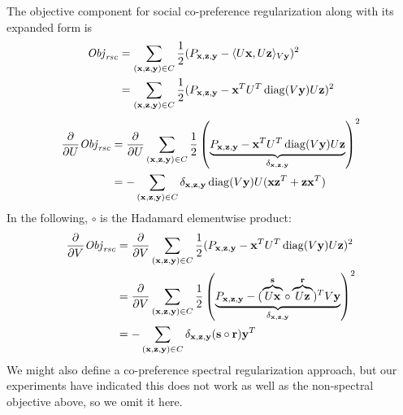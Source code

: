 The objective component for social co-preference regularization along
with its expanded form is
\begin{align}
\Obj_\rsc & = \sum_{(\x,\z,\y) \in C} \frac{1}{2} (P_{\x,\z,\y} - \la U\x, U\z \ra_{V\y})^2 \\
& = \sum_{(\x,\z,\y) \in C} \frac{1}{2} (P_{\x,\z,\y} - \x^T U^T \diag(V\y) U \z)^2 \nonumber
\end{align}
\begin{align*}
\frac{\partial}{\partial U} \Obj_\rsc & = \frac{\partial}{\partial U} \sum_{(\x,\z,\y) \in C} \frac{1}{2} \left( \underbrace{P_{\x,\z,\y} - \x^T U^T \diag(V\y) U \z}_{\delta_{\x,\z,\y}} \right)^2\\
& = - \sum_{(\x,\z,\y) \in C} \delta_{\x,\z,\y} \diag(V\y) U (\x \z^T + \z \x^T)
\end{align*}
In the following, $\circ$ is the Hadamard elementwise product:
\begin{align*}
\frac{\partial}{\partial V} \Obj_\rsc & = \frac{\partial}{\partial V} \sum_{(\x,\z,\y) \in C} \frac{1}{2} (P_{\x,\z,\y} - \x^T U^T \diag(V\y) U \z)^2\\
 & = \frac{\partial}{\partial V} \sum_{(\x,\z,\y) \in C} \frac{1}{2} \left( \underbrace{P_{\x,\z,\y} -  (\overbrace{U\x}^\s \circ \overbrace{U\z}^\r)^T V\y}_{\delta_{\x,\z,\y}} \right)^2\\
 & = - \sum_{(\x,\z,\y) \in C} \delta_{\x,\z,\y} (\s \circ \r) \y^T
\end{align*}
We might also define a co-preference spectral regularization approach,
but our experiments have indicated this does not work as well as the
non-spectral objective above, so we omit it here.

